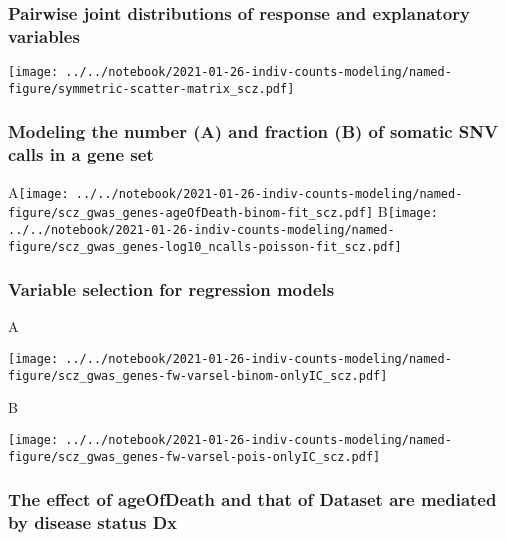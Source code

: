 \documentclass[letterpaper]{article}
\begin{document}
\subsubsection*{Pairwise joint distributions of response and explanatory variables}

\texttt{[image: ../../notebook/2021-01-26-indiv-counts-modeling/named-figure/symmetric-scatter-matrix\_scz.pdf]}


\subsubsection*{Modeling the number (A) and fraction (B) of somatic SNV calls in a gene set}

A\texttt{[image: ../../notebook/2021-01-26-indiv-counts-modeling/named-figure/scz\_gwas\_genes-ageOfDeath-binom-fit\_scz.pdf]}
B\texttt{[image: ../../notebook/2021-01-26-indiv-counts-modeling/named-figure/scz\_gwas\_genes-log10\_ncalls-poisson-fit\_scz.pdf]}


\subsubsection*{Variable selection for regression models}

A

\texttt{[image: ../../notebook/2021-01-26-indiv-counts-modeling/named-figure/scz\_gwas\_genes-fw-varsel-binom-onlyIC\_scz.pdf]}

B

\texttt{[image: ../../notebook/2021-01-26-indiv-counts-modeling/named-figure/scz\_gwas\_genes-fw-varsel-pois-onlyIC\_scz.pdf]}

\subsubsection*{The effect of ageOfDeath and that of Dataset are mediated by disease status Dx}
\end{document}
